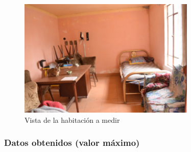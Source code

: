 \documentclass[letter,11pt]{article}
\begin{document}
\begin{figure}
\centering
\includegraphics[width=0.75\textwidth]{eps/1.2.sonometro.eps}
\caption{Vista de la habitación a medir}
\label{sonometro}
\end{figure}

\subsubsection{Datos obtenidos (valor máximo)}
\end{document}
